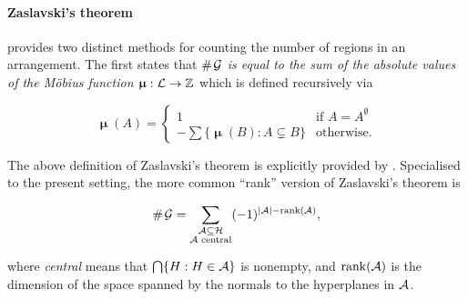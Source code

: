 \documentclass[12pt,a4paper,twoside]{article}
\makeatletter
\newcommand{\srcsize}{\@setfontsize{\srcsize}{3pt}{3pt}}
\newcommand{\posreal}{\mbb R_{\mdoubleplus}}
\newcommand\mdoubleplus{\text{\srcsize$+\mkern-2mu+$}}
\newcommand{\countof}{\mathbin{\#}\hskip1pt}
\newcommand{\mbbtpp}{{\mathfrak{T}}}
\newcommand{\bmu}{\bm{\upmu}}
\DeclareMathOperator{\rank}{rank}
\makeatother
\begin{document}
\begin{appendices}
\paragraph{Zaslavski's theorem} provides two distinct methods for counting the
number of regions in an arrangement. The first states that \emph{$\countof \mc
G$ is equal to the sum of the absolute values of the M\"{o}bius function $\bmu:
\mc L \rightarrow \mbb Z$} which is defined recursively via
\begin{linenomath*}
  \begin{equation}\label{eq-mobius}
\bmu(A) = \left \{
\begin{array}{ll}
  1 & \text{if $A = A^{\emptyset}$}\\
  -\sum\{\bmu(B):  A \subsetneq B\} & \text{otherwise.}%
\end{array}\right.
\end{equation}
\end{linenomath*}
The above definition of Zaslavski's theorem is explicitly provided by
\citet{sagan1999why}. Specialised to the present setting, the more common
\citep[see
][]{orlik1992arrangements,dimca2017hyperplane,stanley2007introduction} ``rank''
version of Zaslavski's theorem is
\begin{linenomath*}
  \begin{equation*}\countof \mc G =\sum_{\substack{\mc A \subseteq \mc H\\
        \mc A \textup{\ central}}} (-1)^{\lvert \mc A \rvert - \rank(\mc
  A)},\end{equation*}
  \end{linenomath*}
  where \emph{central} means that $\bigcap \{H: H \in \mathcal A\}$ is nonempty, and
  $\rank (\mc A)$ is the dimension of the space spanned by the normals to the
  hyperplanes in $\mathcal A$.

\end{appendices}
\end{document}
